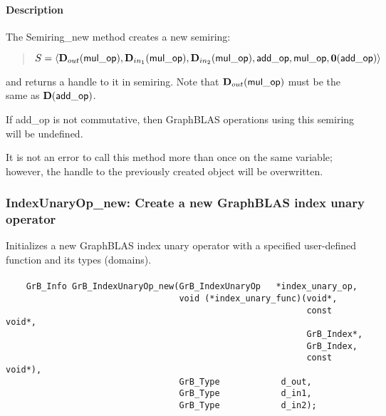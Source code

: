 \paragraph{Description}

The {\sf Semiring\_new} method creates a new semiring:
\begin{quote}
$S = \langle \mbox{$\mathbf{D}_{out}$}({\sf mul\_op}), 
\mbox{$\mathbf{D}_{in_{1}}$}({\sf mul\_op}), \mbox{$\mathbf{D}_{in_{2}}$}({\sf mul\_op}), {\sf add\_op}, 
{\sf mul\_op}, \mathbf{0}({\sf add\_op})\rangle$
\end{quote}
and returns a handle to it in 
{\sf semiring}.  Note that $\mbox{$\mathbf{D}_{out}$}({\sf mul\_op})$ must be the same as 
$\mathbf{D}({\sf add\_op})$.

If {\sf add\_op} is not commutative, then GraphBLAS operations using this semiring
will be undefined.

It is not an error to call this method more than once on the same variable;  
however, the handle to the previously created object will be overwritten. 


\subsubsection{{\sf IndexUnaryOp\_new}: Create a new GraphBLAS index unary operator }

Initializes a new GraphBLAS index unary operator with a specified user-defined 
function and its types (domains).

\paragraph{\syntax}

\begin{verbatim}
    GrB_Info GrB_IndexUnaryOp_new(GrB_IndexUnaryOp   *index_unary_op,
                                  void (*index_unary_func)(void*,
                                                           const void*,
                                                           GrB_Index*,
                                                           GrB_Index,
                                                           const void*),
                                  GrB_Type            d_out,
                                  GrB_Type            d_in1,
                                  GrB_Type            d_in2);
\end{verbatim}

